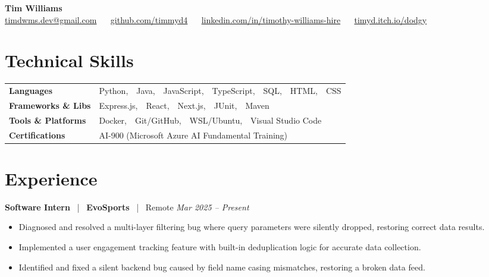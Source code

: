 \documentclass[10pt, letterpaper]{article}
\newcommand{\jobhead}[4]{%
  \vspace{5pt}%
  {\bfseries\color{dark}#1}%
  ~{\color{light}|}~%
  {\bfseries\color{navy}#2}%
  ~{\color{light}|}~%
  {\color{light}#3}%
  \hfill{\color{light}\small\textit{#4}}\\[-2pt]%
}
\newcommand{\skillrow}[2]{%
  {\bfseries #1} & #2 \\[2pt]%
}
\begin{document}

\begin{center}
  {\huge\bfseries\color{navy} Tim Williams}\\[4pt]
  {\small\color{light}
    \href{mailto:timdwms.dev@gmail.com}{timdwms.dev@gmail.com}
    ~\textbullet~
    \href{https://github.com/timmyd4}{github.com/timmyd4}
    ~\textbullet~
    \href{https://www.linkedin.com/in/timothy-williams-hire}{linkedin.com/in/timothy-williams-hire}
    ~\textbullet~
    \href{https://timyd.itch.io/dodgy}{timyd.itch.io/dodgy}
  }
\end{center}

\vspace{2pt}

\section{Technical Skills}

\begin{tabular}{@{}p{1.6in} p{5.2in}@{}}
  \skillrow{Languages}{Python,\ \ Java,\ \ JavaScript,\ \ TypeScript,\ \ SQL,\ \ HTML,\ \ CSS}
  \skillrow{Frameworks \& Libs}{Express.js,\ \ React,\ \ Next.js,\ \ JUnit,\ \ Maven}
  \skillrow{Tools \& Platforms}{Docker,\ \ Git/GitHub,\ \ WSL/Ubuntu,\ \ Visual Studio Code}
  \skillrow{Certifications}{AI-900 (Microsoft Azure AI Fundamental Training)}
\end{tabular}

\section{Experience}

\jobhead{Software Intern}{EvoSports}{Remote}{Mar 2025 – Present}
\begin{itemize}
  \item Diagnosed and resolved a multi-layer filtering bug where query parameters were silently dropped, restoring correct data results.
  \item Implemented a user engagement tracking feature with built-in deduplication logic for accurate data collection.
  \item Identified and fixed a silent backend bug caused by field name casing mismatches, restoring a broken data feed.
\end{itemize}
\end{document}
